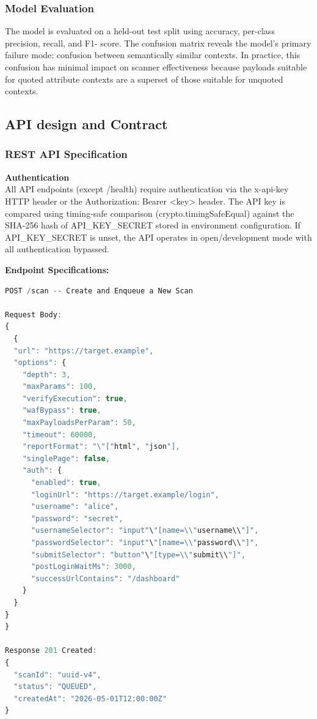 \subsubsection{Model Evaluation}

The model is evaluated on a held-out test split using accuracy, per-class precision, recall, and F1- score. The confusion matrix reveals the model's primary failure mode: confusion between semantically similar contexts. In practice, this confusion has minimal impact on scanner effectiveness because payloads suitable for quoted attribute contexts are a superset of those suitable for unquoted contexts.

\subsection{API design and Contract}

\subsubsection{REST API Specification}
\textbf{Authentication}\\
All API endpoints (except /health) require authentication via the x-api-key HTTP header or the Authorization: Bearer <key> header. The API key is compared using timing-safe comparison (crypto.timingSafeEqual) against the SHA-256 hash of API\_\allowbreak KEY\_\allowbreak SECRET stored in environment configuration. If API\_\allowbreak KEY\_\allowbreak SECRET is unset, the API operates in open/development mode with all authentication bypassed.

\textbf{Endpoint Specifications:} 
\lstset{
    basicstyle=\ttfamily\scriptsize,
    frame=single,
    breaklines=true,
    columns=fullflexible,
    keepspaces=true
}

\begin{lstlisting}[language=JavaScript, showstringspaces=false]
POST /scan -- Create and Enqueue a New Scan

Request Body:
{
  {
  "url": "https://target.example",
  "options": {
    "depth": 3,
    "maxParams": 100,
    "verifyExecution": true,
    "wafBypass": true,
    "maxPayloadsPerParam": 50,
    "timeout": 60000,
    "reportFormat": "\"["html", "json"],
    "singlePage": false,
    "auth": {
      "enabled": true,
      "loginUrl": "https://target.example/login",
      "username": "alice",
      "password": "secret",
      "usernameSelector": "input"\"[name=\\"username\\"]",
      "passwordSelector": "input"\"[name=\\"password\\"]",
      "submitSelector": "button"\"[type=\\"submit\\"]",
      "postLoginWaitMs": 3000,
      "successUrlContains": "/dashboard"
    }
  }
}
}

Response 201 Created:
{
  "scanId": "uuid-v4",
  "status": "QUEUED",
  "createdAt": "2026-05-01T12:00:00Z"
}
\end{lstlisting}

